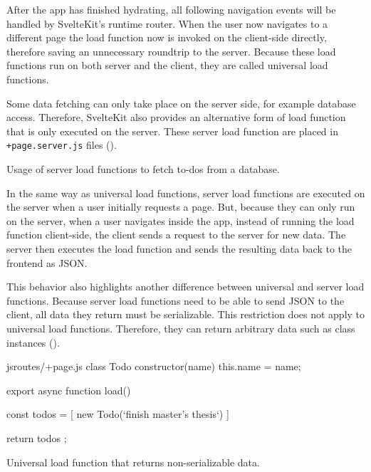After the app has finished hydrating, all following navigation events will be handled by SvelteKit's runtime router. When the user now navigates to a different page the load function now is invoked on the client-side directly, therefore saving an unnecessary roundtrip to the server. Because these load functions run on both server and the client, they are called universal load functions.

Some data fetching can only take place on the server side, for example database access. Therefore, SvelteKit also provides an alternative form of load function that is only executed on the server. These server load function are placed in \texttt{+page.server.js} files ().

\begin{listing}[h!]
\s{$}
\caption{Usage of server load functions to fetch to-dos from a database.}
\label{fig:sveltekit-server-load-function}
\end{listing}

In the same way as universal load functions, server load functions are executed on the server when a user initially requests a page. But, because they can only run on the server, when a user navigates inside the app, instead of running the load function client-side, the client sends a request to the server for new data. The server then executes the load function and sends the resulting data back to the frontend as JSON.

This behavior also highlights another difference between universal and server load functions. Because server load functions need to be able to send JSON to the client, all data they return must be serializable. This restriction does not apply to universal load functions. Therefore, they can return arbitrary data such as class instances ().

\begin{listing}[h!]
\begin{myminted}{js}{routes/+page.js}
class Todo {
  constructor(name) {
    this.name = name;
  }
}

export async function load() {
  const todos =  [ new Todo(`finish master's thesis`) ]

  return { todos };
}
\end{myminted}
\caption{Universal load function that returns non-serializable data.}
\label{fig:sveltekit-universal-load}
\end{listing}

